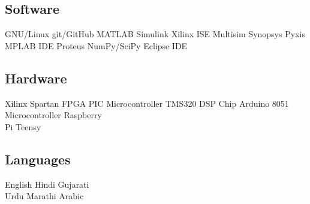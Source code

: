 \documentclass[]{deedy}
\begin{document}
\begin{minipage}[t]{0.27\textwidth}
\begin{flushleft}
\subsection{Software}
GNU/Linux \textbullet{} git/GitHub \textbullet{} MATLAB \textbullet{} Simulink \textbullet{} Xilinx ISE \textbullet{} Multisim \textbullet{} Synopsys \textbullet{} Pyxis \textbullet{} MPLAB IDE \textbullet{} Proteus \textbullet{} NumPy/SciPy \textbullet{} Eclipse IDE
%
\subsection{Hardware}
Xilinx Spartan FPGA \textbullet{} PIC Microcontroller \textbullet{} TMS320 DSP Chip \textbullet{} Arduino \textbullet{} 8051 Microcontroller \textbullet{} Raspberry\\
Pi \textbullet{} Teensy
%
\subsection{Languages}
English \textbullet{} Hindi \textbullet{} Gujarati \textbullet{}\\
Urdu \textbullet{} Marathi \textbullet{} Arabic
\sectionsep
%
\end{flushleft}
\end{minipage}
\hfill
%
\end{document}
